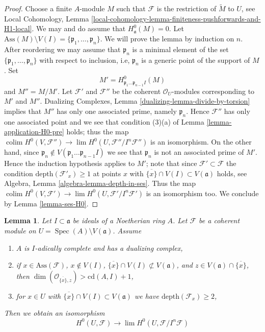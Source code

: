\documentclass{stacks-project}
\theoremstyle{plain}
\newtheorem{lemma}[subsection]{Lemma}
\theoremstyle{definition}
\theoremstyle{remark}
\numberwithin{equation}{subsection}
\def\lim{\mathop{\mathrm{lim}}\nolimits}
\def\colim{\mathop{\mathrm{colim}}\nolimits}
\def\Spec{\mathop{\mathrm{Spec}}}
\begin{document}
\begin{proof}
\medskip\noindent
Choose a finite $A$-module $M$ such that $\mathcal{F}$ is the restriction
of $\widetilde{M}$ to $U$, see Local Cohomology, Lemma
\ref{local-cohomology-lemma-finiteness-pushforwards-and-H1-local}.
We may and do assume that $H^0_\mathfrak a(M) = 0$.
Let $\text{Ass}(M) \setminus V(I) = \{\mathfrak p_1, \ldots, \mathfrak p_n\}$.
We will prove the lemma by induction on $n$. After reordering we
may assume that $\mathfrak p_n$ is a minimal element of the set
$\{\mathfrak p_1, \ldots, \mathfrak p_n\}$ with respect to inclusion, i.e,
$\mathfrak p_n$ is a generic point of the support of $M$.
Set
$$
M' = H^0_{\mathfrak p_1 \ldots \mathfrak p_{n - 1} I}(M)
$$
and $M'' = M/M'$. Let $\mathcal{F}'$ and $\mathcal{F}''$ be the
coherent $\mathcal{O}_U$-modules corresponding to $M'$ and $M''$.
Dualizing Complexes, Lemma \ref{dualizing-lemma-divide-by-torsion}
implies that $M''$ has only one associated prime, namely $\mathfrak p_n$.
Hence $\mathcal{F}''$ has only one associated point and
we see that condition (3)(a) of Lemma \ref{lemma-application-H0-pre} holds;
thus the map $\colim H^0(V, \mathcal{F}'')
\to \lim H^0(U, \mathcal{F}''/I^n\mathcal{F}'')$ is an isomorphism.
On the other hand, since
$\mathfrak p_n \not \in V(\mathfrak p_1 \ldots \mathfrak p_{n - 1} I)$
we see that $\mathfrak p_n$ is not an associated prime of $M'$.
Hence the induction hypothesis applies to $M'$; note
that since $\mathcal{F}' \subset \mathcal{F}$
the condition $\text{depth}(\mathcal{F}'_x) \geq 1$ at points $x$ with
$\overline{\{x\}} \cap V(I) \subset V(\mathfrak a)$ holds, see
Algebra, Lemma \ref{algebra-lemma-depth-in-ses}.
Thus the map
$\colim H^0(V, \mathcal{F}')
\to \lim H^0(U, \mathcal{F}'/I^n\mathcal{F}')$ is an isomorphism too.
We conclude by Lemma \ref{lemma-ses-H0}.
\end{proof}

\begin{lemma}
\label{lemma-application-H0}
Let $I \subset \mathfrak a$ be ideals of a Noetherian ring $A$.
Let $\mathcal{F}$ be a coherent module on
$U = \Spec(A) \setminus V(\mathfrak a)$.
Assume
\begin{enumerate}
\item $A$ is $I$-adically complete and has a dualizing complex,
\item if $x \in \text{Ass}(\mathcal{F})$, $x \not \in V(I)$,
$\overline{\{x\}} \cap V(I) \not \subset V(\mathfrak a)$, and
$z \in V(\mathfrak a) \cap \overline{\{x\}}$, then
$\dim(\mathcal{O}_{\overline{\{x\}}, z}) > \text{cd}(A, I) + 1$,
\item for $x \in U$ with $\overline{\{x\}} \cap V(I) \subset V(\mathfrak a)$
we have $\text{depth}(\mathcal{F}_x) \geq 2$,
\end{enumerate}
Then we obtain an isomorphism
$$
H^0(U, \mathcal{F})
\longrightarrow
\lim H^0(U, \mathcal{F}/I^n\mathcal{F})
$$
\end{lemma}
\end{document}
